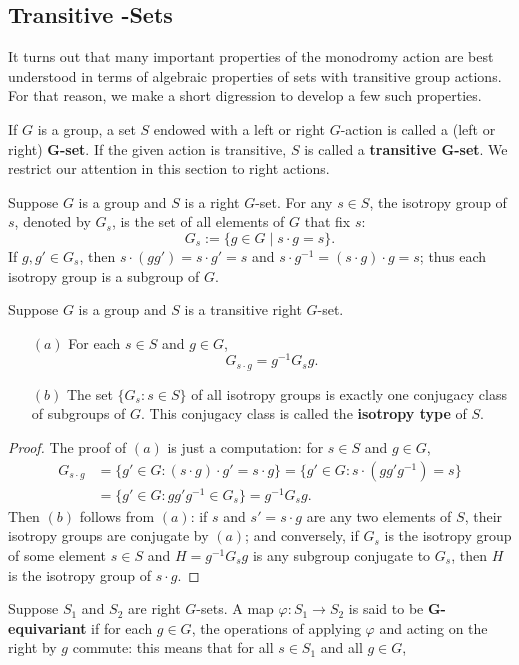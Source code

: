 \subsection{Transitive -Sets}
It turns out that many important properties of the monodromy action are best understood in terms of algebraic properties of sets with transitive group actions. For that reason, we make a short digression to develop a few such properties.\par
If $G$ is a group, a set $S$ endowed with a left or right $G$-action is called a (left or right) \textbf{$\bm{G}$-set}. If the given action is transitive, $S$ is called a \textbf{transitive $\bm{G}$-set}. We restrict our attention in this section to right actions.\par
Suppose $G$ is a group and $S$ is a right $G$-set. For any $s\in S$, the isotropy group of $s$, denoted by $G_s$, is the set of all elements of $G$ that fix $s$:
\[G_s:=\{g\in G\mid s\cdot g=s\}.\]
If $g,g'\in G_s$, then $s\cdot(gg')=s\cdot g'=s$ and $s\cdot g^{-1}=(s\cdot g)\cdot g=s$; thus each isotropy group is a subgroup of $G$.
\begin{proposition}\label{G isotropy group}
Suppose $G$ is a group and $S$ is a transitive right $G$-set.
\begin{itemize}
\item[$(a)$]For each $s\in S$ and $g\in G$,
\[G_{s\cdot g}=g^{-1}G_sg.\]
\item[$(b)$]The set $\{G_s:s\in S\}$ of all isotropy groups is exactly one conjugacy class of subgroups of $G$. This conjugacy class is called the \textbf{isotropy type} of $S$.
\end{itemize}
\end{proposition}
\begin{proof}
The proof of $(a)$ is just a computation: for $s\in S$ and $g\in G$,
\begin{align*}
G_{s\cdot g}&=\{g'\in G:(s\cdot g)\cdot g'=s\cdot g\}=\{g'\in G:s\cdot(gg'g^{-1})=s\}\\&=\{g'\in G:gg'g^{-1}\in G_s\}=g^{-1}G_sg.
\end{align*}
Then $(b)$ follows from $(a)$: if $s$ and $s'=s\cdot g$ are any two elements of $S$, their isotropy groups are conjugate by $(a)$; and conversely, if $G_s$ is the isotropy group of some element $s\in S$ and $H=g^{-1}G_sg$ is any subgroup conjugate to $G_s$, then $H$ is the isotropy group of $s\cdot g$.
\end{proof}
Suppose $S_1$ and $S_2$ are right $G$-sets. A map $\varphi:S_1\to S_2$ is said to be \textbf{$\bm{G}$-equivariant} if for each $g\in G$, the operations of applying $\varphi$ and acting on the right by $g$ commute: this means that for all $s\in S_1$ and all $g\in G$,
